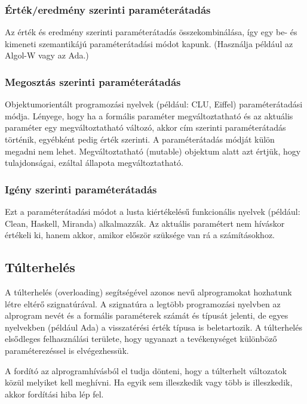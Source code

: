 \documentclass[margin=0px]{article}
\begin{document}
	\subsubsection{Érték/eredmény szerinti paraméterátadás}
	
	Az érték és eredmény szerinti paraméterátadás összekombinálása, így egy be- és kimeneti szemantikájú paraméterátadási módot kapunk. (Használja például az Algol-W vagy az Ada.)
	
	\subsubsection{Megosztás szerinti paraméterátadás}
	
	Objektumorientált programozási nyelvek (például: CLU, Eiffel) paraméterátadási módja. Lényege, hogy ha a formális paraméter megváltoztatható és az aktuális paraméter egy megváltoztatható változó, akkor cím szerinti paraméterátadás történik, egyébként pedig érték szerinti. A paraméterátadás módját külön megadni nem lehet.
	Megváltoztatható (mutable) objektum alatt azt értjük, hogy tulajdonságai, ezáltal állapota megváltoztatható.
	
	\subsubsection{Igény szerinti paraméterátadás}
	
	Ezt a paraméterátadási módot a lusta kiértékelésű funkcionális nyelvek (például: Clean, Haskell, Miranda) alkalmazzák. Az aktuális paramétert nem híváskor értékeli ki, hanem akkor, amikor először szüksége van rá a számításokhoz.
	
	\subsection{Túlterhelés}
	
	A túlterhelés (overloading) segítségével azonos nevű alprogramokat hozhatunk létre eltérő szignatúrával. A szignatúra a legtöbb programozási nyelvben az alprogram nevét és a formális paraméterek számát és típusát jelenti, de egyes nyelvekben (például Ada) a visszatérési érték típusa is beletartozik. A túlterhelés elsődleges felhasználási területe, hogy ugyanazt a tevékenységet különböző paraméterezéssel is elvégezhessük.
	
	A fordító az alprogramhívásból el tudja dönteni, hogy a túlterhelt változatok közül melyiket kell meghívni. Ha egyik sem illeszkedik vagy több is illeszkedik, akkor fordítási hiba lép fel.
	
\end{document}

